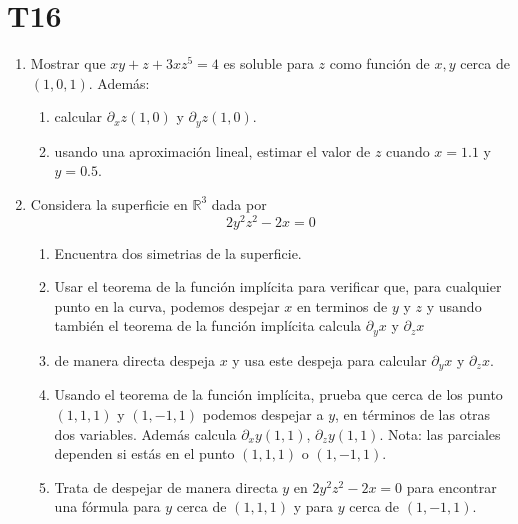 \documentclass{article}
\theoremstyle{definition}
\begin{document}
  \section*{T16 }

  
  
	\begin{enumerate}

        \item Mostrar que $xy+z+3xz^5=4$ es soluble para $z$ como
          funci\'on de $x,y$ cerca de $(1,0,1)$. Adem\'as:
          \begin{enumerate}
          \item calcular $\partial_xz(1,0)$ y $\partial_yz(1,0)$.
          \item usando una aproximaci\'on lineal, estimar el valor de $z$
            cuando $x=1.1$ y $y=0.5$.
          \end{enumerate}
          
        \item Considera la superficie en $\mathbb{R}^3$ dada por
          $$
          2y^2z^2-2x=0
          $$

          \begin{enumerate}

          \item Encuentra dos simetrias de la superficie.
            
          \item Usar el teorema de la funci\'on impl\'icita para verificar
            que, para cualquier punto en la curva,
            podemos despejar $x$ en terminos de $y$ y $z$ y usando
            tambi\'en el teorema de la funci\'on impl\'icita
            calcula $\partial_y x$ y $\partial_z x$
          \item de manera directa despeja $x$ y usa este despeja para calcular
            $\partial_y x$ y $\partial_z x$.

            

          \item Usando el teorema de la funci\'on
            impl\'icita, prueba que cerca de los punto $(1,1,1)$ y $(1,-1,1)$ podemos
            despejar a  $y$, en t\'erminos de las otras dos variables. Adem\'as
            calcula $\partial_xy(1,1)$, $\partial_z y (1,1)$. Nota:
            las parciales dependen si est\'as en el punto $(1,1,1)$ o $(1,-1,1)$.

          \item Trata de despejar de manera directa $y$ en $2y^2z^2-2x=0$
            para encontrar una f\'ormula para $y$ cerca de $(1,1,1)$
            y para $y$ cerca de $(1,-1,1)$.
            


\end{enumerate}
\end{enumerate}
\end{document}
